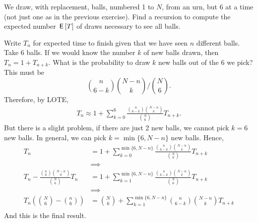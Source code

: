 \documentclass[lectures]{subfiles}
\begin{document}
\begin{exercise}
We draw, with replacement, balls, numbered 1 to $N$, from an urn, but 6 at a time (not just one as in the previous exercise).
Find a recursion to compute the expected number $\,\mathsf{E}\left[T\right]$ of draws necessary to see all balls.
\begin{solution}
  Write $T_{n}$ for expected time to finish given that we have seen $n$ different balls.
  Take 6 balls.
  If we would know the number $k$ of new balls drawn, then $T_{n} = 1 + T_{n+k}$.
  What is the probability to draw $k$ new balls  out of the 6 we pick?
  This must be
\begin{equation}
\label{eq:930}
{n \choose 6-k}{N-n \choose k}\big/{N \choose 6}.
\end{equation}
Therefore, by LOTE,
\begin{align}
T_{n}
\approx
1 + \sum_{k=0}^{6} \frac{{n \choose 6-k}{N-n \choose k}}{{N \choose 6}} T_{n+k}.
\end{align}
But there is a slight problem, if there are just 2 new balls,  we cannot pick $k=6$ new balls. In general, we can pick $k=\min\{6, N-n\}$ new balls. Hence,
\begin{align}
T_{n}
&=
1 + \sum_{k=0}^{\min\{6, N-n\}} \frac{{n \choose 6-k}{N-n \choose k}}{{N \choose 6}} T_{n+k} \\
&\implies \\
T_{n} - \frac{{n \choose 6}{N-n \choose 0}}{{N \choose 6}} T_{n}
&=1 + \sum_{k=1}^{\min\{6, N-n\}} \frac{{n \choose 6-k}{N-n \choose k}}{{N \choose 6}} T_{n+k} \\
&\implies \\
T_{n}\left( {N\choose 6}  -{n \choose 6} \right)
&={N\choose 6} + \sum_{k=1}^{\min\{6, N-n\}}{n \choose 6-k}{N-n \choose k} T_{n+k} \\
\end{align}
And this is the final result.

\end{solution}
\end{exercise}
\end{document}
